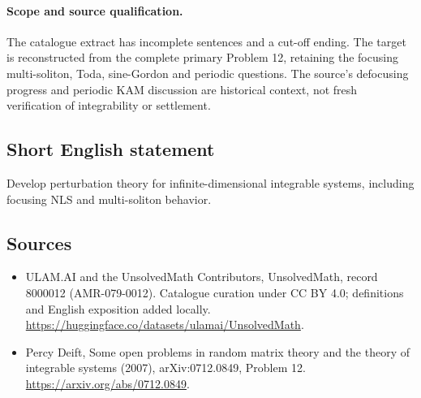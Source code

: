 \documentclass[11pt]{article}
\begin{document}
\paragraph{Scope and source qualification.}The catalogue extract has incomplete sentences and a cut-off ending. The target is reconstructed from the complete primary Problem 12, retaining the focusing multi-soliton, Toda, sine-Gordon and periodic questions. The source’s defocusing progress and periodic KAM discussion are historical context, not fresh verification of integrability or settlement.
\subsection{Short English statement}
Develop perturbation theory for infinite-dimensional integrable systems, including focusing NLS and multi-soliton behavior.
\subsection{Sources}
\begin{itemize}
\item[\hypertarget{source:8000012:1}{S1}] ULAM.AI and the UnsolvedMath Contributors, UnsolvedMath, record 8000012 (AMR-079-0012). Catalogue curation under CC BY 4.0; definitions and English exposition added locally.
\url{https://huggingface.co/datasets/ulamai/UnsolvedMath}.
\item[\hypertarget{source:8000012:2}{S2}] Percy Deift, Some open problems in random matrix theory and the theory of integrable systems (2007), arXiv:0712.0849, Problem 12.
\url{https://arxiv.org/abs/0712.0849}.
\end{itemize}
\label{end:8000012}
\end{document}
